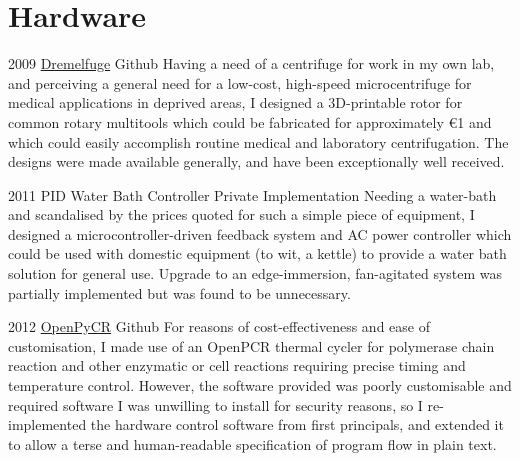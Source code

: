 \documentclass[]{friggeri-cv} %
\begin{document}
\section{Hardware}
\begin{entrylist}
\entry
{2009}
{\href{https://github.com/cathalgarvey/dremelfuge}{Dremelfuge}}
{Github}
{Having a need of a centrifuge for work in my own lab, and perceiving a general
need for a low-cost, high-speed microcentrifuge for medical applications in deprived
areas, I designed a 3D-printable rotor for common rotary multitools which could be
fabricated for approximately \euro1 and which could easily accomplish routine medical and
laboratory centrifugation. The designs were made available generally, and have been
exceptionally well received.
}

\entry
{2011}
{PID Water Bath Controller}
{Private Implementation}
{Needing a water-bath and scandalised by the prices quoted for such a simple piece
of equipment, I designed a microcontroller-driven feedback system and AC power controller
which could be used with domestic equipment (to wit, a kettle) to provide a water bath
solution for general use. Upgrade to an edge-immersion, fan-agitated system was partially
implemented but was found to be unnecessary.
}

\entry
{2012}
{\href{https://github.com/cathalgarvey/openpycr}{OpenPyCR}}
{Github}
{For reasons of cost-effectiveness and ease of customisation, I made use of an OpenPCR
thermal cycler for polymerase chain reaction and other enzymatic or cell reactions requiring
precise timing and temperature control. However, the software provided was poorly customisable
and required software I was unwilling to install for security reasons, so I re-implemented
the hardware control software from first principals, and extended it to allow a terse and
human-readable specification of program flow in plain text.
}

\end{entrylist}

\end{document}
